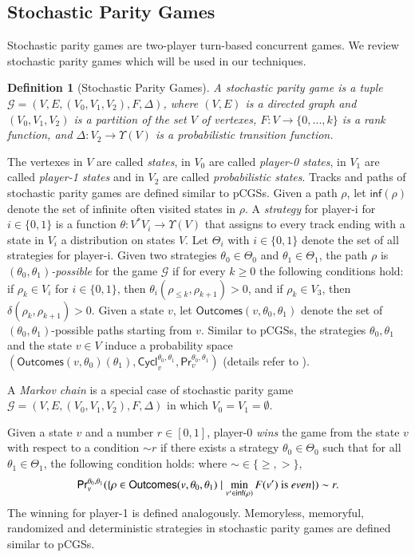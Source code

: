 \documentclass[letterpaper]{article}
\newcommand{\calM}{\mathcal{G}}
\newcommand{\Cycl}{\textsf{Cycl}}
\newcommand{\outcomes}{\textsf{Outcomes}}
\newcommand{\Prb}{\textsf{Pr}}
\newcommand{\inff}{\textsf{inf}}
\newtheorem{definition}{Definition}
\begin{document}
\subsection{Stochastic Parity Games}
Stochastic parity games are two-player turn-based concurrent games. We review stochastic parity games which will be used in our techniques.

\begin{definition}[Stochastic Parity Games]
A \emph{stochastic parity game} is a tuple $\calM=(V,E,(V_0,V_1,V_2),F,\Delta)$, where $(V,E)$ is a directed graph and $(V_0,V_1,V_2)$ is a partition of the set $V$ of vertexes,
$F:V\rightarrow\{0,...,k\}$ is a \emph{rank function}, and $\Delta:V_2\rightarrow\Upsilon(V)$ is a \emph{probabilistic transition function}.
\end{definition}
The vertexes in $V$ are called \emph{states},  in $V_0$ are called \emph{player-0 states}, in $V_1$ are called \emph{player-1 states} and
in $V_2$ are called \emph{probabilistic states}. Tracks and paths of stochastic parity games are defined similar to pCGSs. Given a path $\rho$, let $\inff(\rho)$ denote the set of infinite often visited states in $\rho$.
A \emph{strategy}  for player-i for $i\in\{0,1\}$ is a function $\theta:V^*V_i\rightarrow \Upsilon(V)$ that assigns to every track ending with a state in $V_i$ a distribution on states $V$. Let $\Theta_i$ with $i\in\{0,1\}$ denote the set of all strategies for player-i.
Given two strategies $\theta_0\in\Theta_0$ and $\theta_1\in\Theta_1$, the path $\rho$ is \emph{$(\theta_0,\theta_1)$-possible} for the game $\calM$ if for every $k\geq 0$ the following conditions hold:
if $\rho_k\in V_i$ for $i\in\{0,1\}$, then $\theta_i(\rho_{\leq k},\rho_{k+1})>0$, and if $\rho_k\in V_3$, then $\delta(\rho_{k},\rho_{k+1})>0$.
Given a state $v$, let $\outcomes(v,\theta_0,\theta_1)$ denote the set of  $(\theta_0,\theta_1)$-possible paths starting from $v$.
Similar to pCGSs, the strategies $\theta_0,\theta_1$ and the state $v\in V$ induce a probability space
$(\outcomes(v,\theta_0)(\theta_1), \Cycl_v^{\theta_0,\theta_1}, \Prb_v^{\theta_0,\theta_1})$ (details refer to \cite{CH12}).

A \emph{Markov chain} is a special case of stochastic parity game $\calM=(V,E,(V_0,V_1,V_2),F,\Delta)$ in which $V_0=V_1=\emptyset$.



Given a state $v$ and a number $r\in[0,1]$, player-0 \emph{wins} the game from the state $v$ with respect to a condition $\sim r$ if there exists a strategy $\theta_0\in\Theta_0$ such that for all $\theta_1\in\Theta_1$, the following condition holds: where $\sim\in\{\geq, >\}$, \[\Prb_v^{\theta_0,\theta_1}(\{\rho\in \outcomes(v,\theta_0,\theta_1)\mid \min\limits_{v'\in \inff(\rho)}F(v') \mbox{ is \emph{even}}\})\sim r.\]
The winning for player-1 is defined analogously.
Memoryless, memoryful, randomized and deterministic strategies in stochastic parity games are defined similar to
pCGSs.
\end{document}

